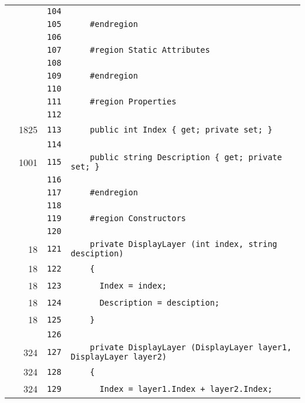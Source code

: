 \documentclass[a4paper,10pt]{article}
\begin{document}
\begin{longtable}[l]{lrrl}
\cellcolor{gray} &  & \verb~104~ & \verb~~\\
\cellcolor{gray} &  & \verb~105~ & \verb~    #endregion~\\
\cellcolor{gray} &  & \verb~106~ & \verb~~\\
\cellcolor{gray} &  & \verb~107~ & \verb~    #region Static Attributes~\\
\cellcolor{gray} &  & \verb~108~ & \verb~~\\
\cellcolor{gray} &  & \verb~109~ & \verb~    #endregion~\\
\cellcolor{gray} &  & \verb~110~ & \verb~~\\
\cellcolor{gray} &  & \verb~111~ & \verb~    #region Properties~\\
\cellcolor{gray} &  & \verb~112~ & \verb~~\\
\cellcolor{green} & 1825 & \verb~113~ & \verb~    public int Index { get; private set; }~\\
\cellcolor{gray} &  & \verb~114~ & \verb~~\\
\cellcolor{green} & 1001 & \verb~115~ & \verb~    public string Description { get; private set; }~\\
\cellcolor{gray} &  & \verb~116~ & \verb~~\\
\cellcolor{gray} &  & \verb~117~ & \verb~    #endregion~\\
\cellcolor{gray} &  & \verb~118~ & \verb~~\\
\cellcolor{gray} &  & \verb~119~ & \verb~    #region Constructors~\\
\cellcolor{gray} &  & \verb~120~ & \verb~~\\
\cellcolor{green} & 18 & \verb~121~ & \verb~    private DisplayLayer (int index, string desciption)~\\
\cellcolor{green} & 18 & \verb~122~ & \verb~    {~\\
\cellcolor{green} & 18 & \verb~123~ & \verb~      Index = index;~\\
\cellcolor{green} & 18 & \verb~124~ & \verb~      Description = desciption;~\\
\cellcolor{green} & 18 & \verb~125~ & \verb~    }~\\
\cellcolor{gray} &  & \verb~126~ & \verb~~\\
\cellcolor{green} & 324 & \verb~127~ & \verb~    private DisplayLayer (DisplayLayer layer1, DisplayLayer layer2)~\\
\cellcolor{green} & 324 & \verb~128~ & \verb~    {~\\
\cellcolor{green} & 324 & \verb~129~ & \verb~      Index = layer1.Index + layer2.Index;~\\

\end{longtable}
\end{document}
